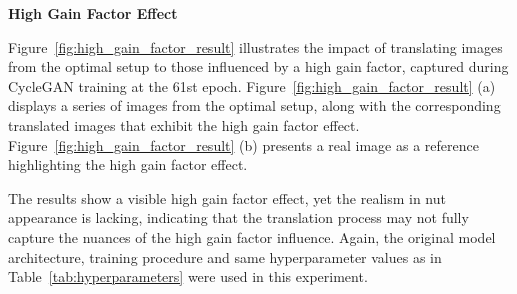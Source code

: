 \documentclass[12pt,DIV14,BCOR12mm,a4paper,footinclude=false,headinclude,parskip=half-,twoside,openright,cleardoublepage=empty,toc=index,bibliography=totoc,listof=totoc]{scrreprt}
\numberwithin{equation}{chapter}
\begin{document}
\textbf{High Gain Factor Effect}

Figure~\ref{fig:high_gain_factor_result} illustrates the impact of translating images from the optimal setup to those influenced by a high gain factor, captured during CycleGAN training at the 61st epoch. Figure~\ref{fig:high_gain_factor_result} (a) displays a series of images from the optimal setup, along with the corresponding translated images that exhibit the high gain factor effect. Figure~\ref{fig:high_gain_factor_result} (b) presents a real image as a reference highlighting the high gain factor effect. 

The results show a visible high gain factor effect, yet the realism in nut appearance is lacking, indicating that the translation process may not fully capture the nuances of the high gain factor influence. Again, the original model architecture, training procedure and same hyperparameter values as in Table~\ref{tab:hyperparameters} were used in this experiment.
\end{document}
